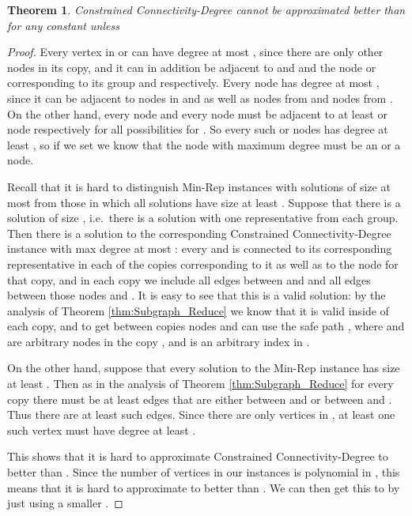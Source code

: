 \documentclass[11pt,letterpaper]{article}
\newtheorem{theorem}{Theorem}[section]
\theoremstyle{definition}
\begin{document}
\begin{theorem} \label{thm:ccdeghard}
{\sc Constrained Connectivity-Degree} cannot be approximated better than  for any constant  unless 
\end{theorem}
\begin{proof}
Every vertex in  or  can have degree at most , since there are only  other nodes in its copy, and it can in addition be adjacent to  and and the node  or  corresponding to its group  and  respectively.  Every node  has degree at most , since it can be adjacent to  nodes in  and  as well as  nodes from  and  nodes from .  On the other hand, every  node and every  node must be adjacent to at least   or  node respectively for all  possibilities for .  So every such  or  nodes has degree at least , so if we set  we know that the node with maximum degree must be an  or a  node.

Recall that it is hard to distinguish {\sc Min-Rep} instances with solutions of size at most  from those in which all solutions have size at least .  Suppose that there is a solution of size , i.e.\ there is a solution with one representative from each group.  Then there is a solution to the corresponding {\sc Constrained Connectivity-Degree} instance with max degree at most : every  and  is connected to its corresponding representative in each of the  copies corresponding to it as well as to the  node for that copy, and in each copy  we include all edges between  and  and all edges between those nodes and .  It is easy to see that this is a valid solution: by the analysis of Theorem \ref{thm:Subgraph_Reduce} we know that it is valid inside of each copy, and to get between copies nodes  and  can use the safe path , where  and  are arbitrary nodes in the copy , and  is an arbitrary index in .

On the other hand, suppose that every solution to the {\sc Min-Rep} instance has size at least .  Then as in the analysis of Theorem \ref{thm:Subgraph_Reduce} for every copy  there must be at least  edges that are either between  and  or between  and .  Thus there are at least  such edges.  Since there are only  vertices in , at least one such vertex must have degree at least .

This shows that it is hard to approximate {\sc Constrained Connectivity-Degree} to better than .  Since the number of vertices  in our instances is polynomial in , this means that it is hard to approximate to better than .  We can then get this to  by just using a smaller .
\end{proof}
\end{document}
